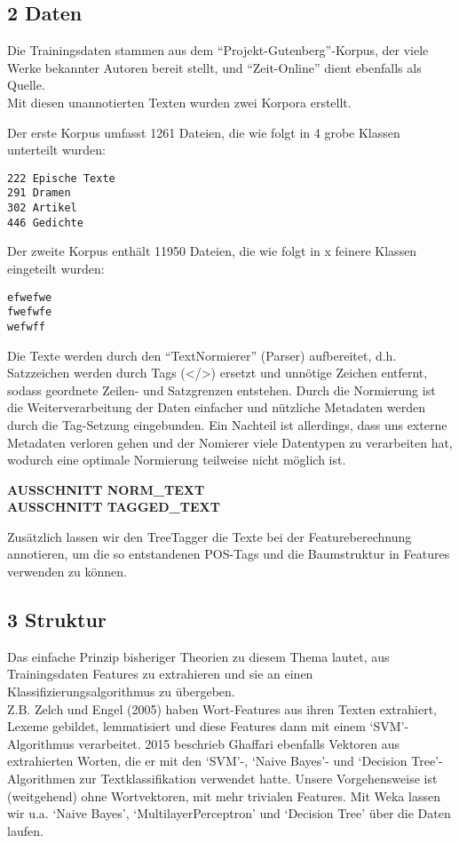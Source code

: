 \documentclass[]{article}
\begin{document}
\subsection{2 Daten}\label{daten}

Die Trainingsdaten stammen aus dem ``Projekt-Gutenberg''-Korpus, der
viele Werke bekannter Autoren bereit stellt, und ``Zeit-Online'' dient
ebenfalls als Quelle.\\
Mit diesen unannotierten Texten wurden zwei Korpora erstellt.

Der erste Korpus umfasst 1261 Dateien, die wie folgt in 4 grobe Klassen
unterteilt wurden:

\begin{verbatim}
222 Epische Texte
291 Dramen
302 Artikel
446 Gedichte
\end{verbatim}

Der zweite Korpus enthält 11950 Dateien, die wie folgt in x feinere
Klassen eingeteilt wurden:

\begin{verbatim}
efwefwe
fwefwfe
wefwff
\end{verbatim}

Die Texte werden durch den ``TextNormierer'' (Parser) aufbereitet, d.h.
Satzzeichen werden durch Tags (\textless{}/\textgreater{}) ersetzt und
unnötige Zeichen entfernt, sodass geordnete Zeilen- und Satzgrenzen
entstehen. Durch die Normierung ist die Weiterverarbeitung der Daten
einfacher und nützliche Metadaten werden durch die Tag-Setzung
eingebunden. Ein Nachteil ist allerdings, dass uns externe Metadaten
verloren gehen und der Nomierer viele Datentypen zu verarbeiten hat,
wodurch eine optimale Normierung teilweise nicht möglich ist.

\textbf{AUSSCHNITT NORM\_TEXT}\\
\textbf{AUSSCHNITT TAGGED\_TEXT}

Zusätzlich lassen wir den TreeTagger die Texte bei der Featureberechnung
annotieren, um die so entstandenen POS-Tags und die Baumstruktur in
Features verwenden zu können.

\subsection{3 Struktur}\label{struktur}

Das einfache Prinzip bisheriger Theorien zu diesem Thema lautet, aus
Trainingsdaten Features zu extrahieren und sie an einen
Klassifizierungsalgorithmus zu übergeben.\\
Z.B. Zelch und Engel (2005) haben Wort-Features aus ihren Texten
extrahiert, Lexeme gebildet, lemmatisiert und diese Features dann mit
einem `SVM'-Algorithmus verarbeitet. 2015 beschrieb Ghaffari ebenfalls
Vektoren aus extrahierten Worten, die er mit den `SVM'-, `Naive Bayes'-
und `Decision Tree'-Algorithmen zur Textklassifikation verwendet hatte.
Unsere Vorgehensweise ist (weitgehend) ohne Wortvektoren, mit mehr
trivialen Features. Mit Weka lassen wir u.a. `Naive Bayes',
`MultilayerPerceptron' und `Decision Tree' über die Daten laufen.
\end{document}
